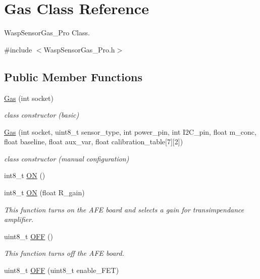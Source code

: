 \hypertarget{class_gas}{}\section{Gas Class Reference}
\label{class_gas}


Wasp\+Sensor\+Gas\+\_\+\+Pro Class.  




{\ttfamily \#include $<$Wasp\+Sensor\+Gas\+\_\+\+Pro.\+h$>$}

\subsection*{Public Member Functions}
\begin{DoxyCompactItemize}
\item 
\hyperlink{class_gas_a24517f1dc8a4c300144b1da1cfdd7d45}{Gas} (int socket)
\begin{DoxyCompactList}\small\item\em class constructor (basic) \end{DoxyCompactList}\item 
\hyperlink{class_gas_a92c0da0cb54445a309cf84c482c1b01b}{Gas} (int socket, uint8\+\_\+t sensor\+\_\+type, int power\+\_\+pin, int I2\+C\+\_\+pin, float m\+\_\+conc, float baseline, float aux\+\_\+var, float calibration\+\_\+table\mbox{[}7\mbox{]}\mbox{[}2\mbox{]})
\begin{DoxyCompactList}\small\item\em class constructor (manual configuration) \end{DoxyCompactList}\item 
int8\+\_\+t \hyperlink{class_gas_a92f32be9143d2ad3bd42aa6316f02632}{ON} ()
\item 
int8\+\_\+t \hyperlink{class_gas_a8ca77049a319053cff80057cf80deb43}{ON} (float R\+\_\+gain)
\begin{DoxyCompactList}\small\item\em This function turns on the A\+FE board and selects a gain for transimpendance amplifier. \end{DoxyCompactList}\item 
uint8\+\_\+t \hyperlink{class_gas_a85a1a2ea4d0ac98e87b61b8662a03428}{O\+FF} ()
\begin{DoxyCompactList}\small\item\em This function turns off the A\+FE board. \end{DoxyCompactList}\item 
uint8\+\_\+t \hyperlink{class_gas_ae4b6c428a66cd5181f6823207b32500e}{O\+FF} (uint8\+\_\+t enable\+\_\+\+F\+ET)

\end{DoxyCompactItemize}
